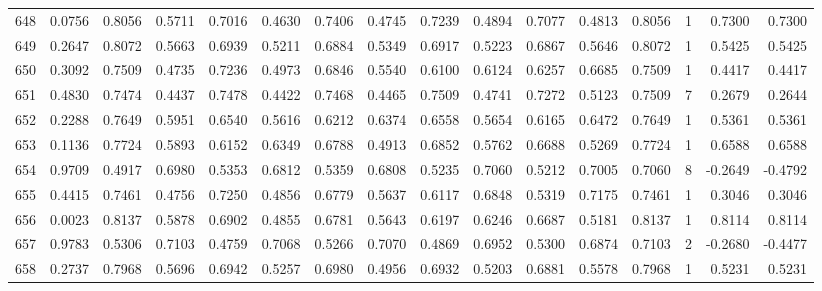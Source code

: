 \begin{tabular}{lrrrrrrrrrrrrrrr}
648 &      0.0756 &  0.8056 &  0.5711 &  0.7016 &  0.4630 &  0.7406 &  0.4745 &  0.7239 &  0.4894 &  0.7077 &   0.4813 &     0.8056 &      1 &                    0.7300 &                     0.7300 \\
649 &      0.2647 &  0.8072 &  0.5663 &  0.6939 &  0.5211 &  0.6884 &  0.5349 &  0.6917 &  0.5223 &  0.6867 &   0.5646 &     0.8072 &      1 &                    0.5425 &                     0.5425 \\
650 &      0.3092 &  0.7509 &  0.4735 &  0.7236 &  0.4973 &  0.6846 &  0.5540 &  0.6100 &  0.6124 &  0.6257 &   0.6685 &     0.7509 &      1 &                    0.4417 &                     0.4417 \\
651 &      0.4830 &  0.7474 &  0.4437 &  0.7478 &  0.4422 &  0.7468 &  0.4465 &  0.7509 &  0.4741 &  0.7272 &   0.5123 &     0.7509 &      7 &                    0.2679 &                     0.2644 \\
652 &      0.2288 &  0.7649 &  0.5951 &  0.6540 &  0.5616 &  0.6212 &  0.6374 &  0.6558 &  0.5654 &  0.6165 &   0.6472 &     0.7649 &      1 &                    0.5361 &                     0.5361 \\
653 &      0.1136 &  0.7724 &  0.5893 &  0.6152 &  0.6349 &  0.6788 &  0.4913 &  0.6852 &  0.5762 &  0.6688 &   0.5269 &     0.7724 &      1 &                    0.6588 &                     0.6588 \\
654 &      0.9709 &  0.4917 &  0.6980 &  0.5353 &  0.6812 &  0.5359 &  0.6808 &  0.5235 &  0.7060 &  0.5212 &   0.7005 &     0.7060 &      8 &                   -0.2649 &                    -0.4792 \\
655 &      0.4415 &  0.7461 &  0.4756 &  0.7250 &  0.4856 &  0.6779 &  0.5637 &  0.6117 &  0.6848 &  0.5319 &   0.7175 &     0.7461 &      1 &                    0.3046 &                     0.3046 \\
656 &      0.0023 &  0.8137 &  0.5878 &  0.6902 &  0.4855 &  0.6781 &  0.5643 &  0.6197 &  0.6246 &  0.6687 &   0.5181 &     0.8137 &      1 &                    0.8114 &                     0.8114 \\
657 &      0.9783 &  0.5306 &  0.7103 &  0.4759 &  0.7068 &  0.5266 &  0.7070 &  0.4869 &  0.6952 &  0.5300 &   0.6874 &     0.7103 &      2 &                   -0.2680 &                    -0.4477 \\
658 &      0.2737 &  0.7968 &  0.5696 &  0.6942 &  0.5257 &  0.6980 &  0.4956 &  0.6932 &  0.5203 &  0.6881 &   0.5578 &     0.7968 &      1 &                    0.5231 &                     0.5231 \\

\end{tabular}
